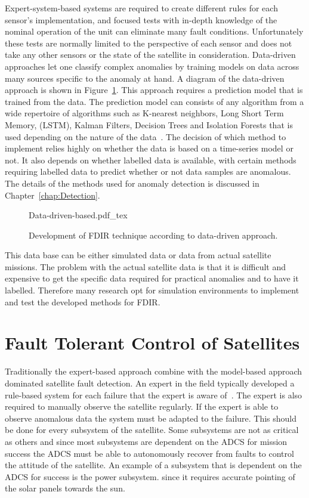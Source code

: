 Expert-system-based systems are required to create different rules for each sensor's implementation, and focused tests with in-depth knowledge of the nominal operation of the unit can eliminate many fault conditions.  Unfortunately these tests are normally limited to the perspective of each sensor and does not take any other sensors or the state of the satellite in consideration. Data-driven approaches let one classify complex anomalies by training models on data across many sources specific to the anomaly at hand. A diagram of the data-driven approach is shown in Figure~\ref{fig:data-driven}. This approach requires a prediction model that is trained from the data. The prediction model can consists of any algorithm from a wide repertoire of algorithms such as K-nearest neighbors, Long Short Term Memory, (LSTM), Kalman Filters, Decision Trees and Isolation Forests that is used depending on the nature of the data~\cite{Liu2021, Ciftciogl1991, Malhotra2016}. The decision of which method to implement relies highly on whether the data is based on a time-series model or not. It also depends on whether labelled data is available, with certain methods requiring labelled data to predict whether or not data samples are anomalous. The details of the methods used for anomaly detection is discussed in Chapter~\ref{chap:Detection}.

\begin{figure}[h!t!b]
	\centering
	\def\svgwidth{14cm}
	{Data-driven-based.pdf_tex}
	\caption{Development of FDIR technique according to data-driven approach.}
	\label{fig:data-driven}
\end{figure}

This data base can be either simulated data or data from actual satellite missions. The problem with the actual satellite data is that it is difficult and expensive to get the specific data required for practical anomalies and to have it labelled. Therefore many research opt for simulation environments to implement and test the developed methods for FDIR.

\section{Fault Tolerant Control of Satellites}
Traditionally the expert-based approach combine with the model-based approach dominated satellite fault detection. An expert in the field typically developed a rule-based system for each failure that the expert is aware of~\cite{Systems1993}. The expert is also required to manually observe the satellite regularly. If the expert is able to observe anomalous data the system must be adapted to the failure. This should be done for every subsystem of the satellite. Some subsystems are not as critical as others and since most subsystems are dependent on the ADCS for mission success the ADCS must be able to autonomously recover from faults to control the attitude of the satellite. An example of a subsystem that is dependent on the ADCS for success is the power subsystem. since it requires accurate pointing of the solar panels towards the sun.

